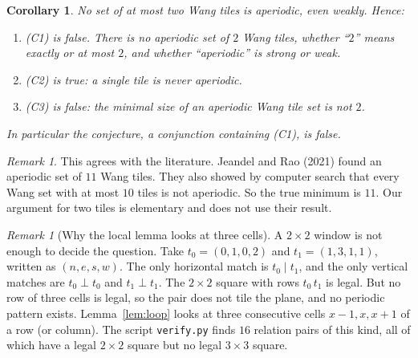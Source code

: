 \documentclass[11pt]{article}
\newtheorem{corollary}[theorem]{Corollary}
\theoremstyle{definition}
\theoremstyle{remark}
\newtheorem{remark}[theorem]{Remark}
\begin{document}
\begin{corollary}\label{cor}
No set of at most two Wang tiles is aperiodic, even weakly. Hence:
\begin{enumerate}
\item (C1) is false. There is no aperiodic set of $2$ Wang tiles, whether
``$2$'' means exactly or at most $2$, and whether ``aperiodic'' is strong or weak.
\item (C2) is true: a single tile is never aperiodic.
\item (C3) is false: the minimal size of an aperiodic Wang tile set is not $2$.
\end{enumerate}
In particular the conjecture, a conjunction containing (C1), is false.
\end{corollary}

\begin{remark}
This agrees with the literature. Jeandel and Rao (2021) found an aperiodic set of
$11$ Wang tiles. They also showed by computer search that every Wang set with at
most $10$ tiles is not aperiodic. So the true minimum is $11$. Our argument for
two tiles is elementary and does not use their result.
\end{remark}

\begin{remark}[Why the local lemma looks at three cells]
A $2\times2$ window is not enough to decide the question. Take
$t_0=(0,1,0,2)$ and $t_1=(1,3,1,1)$, written as $(n,e,s,w)$. The only horizontal
match is $t_0\mathrel{|}t_1$, and the only vertical matches are
$t_0\mathrel{\bot}t_0$ and $t_1\mathrel{\bot}t_1$. The $2\times2$ square with
rows $t_0\,t_1$ is legal. But no row of three cells is legal, so the pair does
not tile the plane, and no periodic pattern exists. Lemma~\ref{lem:loop} looks
at three consecutive cells $x-1,x,x+1$ of a row (or column). The script
\texttt{verify.py} finds $16$ relation pairs of this kind, all of which have a
legal $2\times2$ square but no legal $3\times3$ square.
\end{remark}
\end{document}
